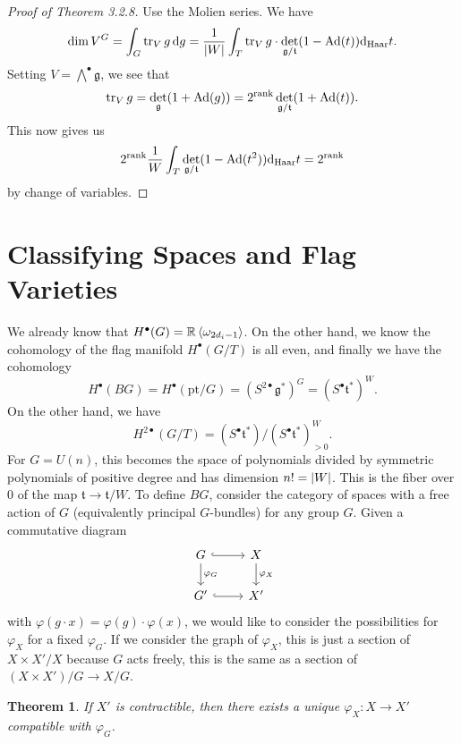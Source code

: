 \documentclass[leqno, openany]{memoir}
\newtheorem{thm}{Theorem}[section]
\theoremstyle{definition}
\theoremstyle{remark}
\theoremstyle{plain}
\theoremstyle{definition}
\theoremstyle{remark}
\newcommand{\R}{\mathbb{R}}
\newcommand{\mf}[1]{\mathfrak{#1}}
\newcommand{\mr}[1]{\mathrm{#1}}
\DeclareMathOperator{\Ad}{Ad}
\begin{document}
\begin{proof}[Proof of Theorem 3.2.8]
    Use the Molien series. We have
    \[ \dim V^G = \int_G \tr_V g \dd{g} = \frac{1}{\abs{W}} \int_T \tr_V g \cdot \det_{\mf{g}/\mf{t}} (1 - \Ad(t)) \dd_{\mr{Haar}} t. \]
    Setting $V = \bigwedge^{\bullet} \mf{g}$, we see that 
    \[ \tr_V g = \det_{\mf{g}} (1 + \Ad(g)) = 2^{\rank} \det_{\mf{g}/\mf{t}} (1 + \Ad(t)). \]
    This now gives us
    \[ 2^{\rank} \frac{1}{W} \int_T \det_{\mf{g}/\mf{t}} (1 - \Ad(t^2)) \dd_{\mr{Haar}} t = 2^{\rank} \]
    by change of variables.
\end{proof}

\section{Classifying Spaces and Flag Varieties}%
\label{sec:classifying_spaces_and_flag_varieties}

We already know that $H^{\bullet}(G) = \R \ev{\omega_{2d_i - 1}}$. On the other hand, we know the cohomology of the flag manifold $H^{\bullet}(G/T)$ is all even, and finally we have the cohomology 
\[ H^{\bullet}(BG) = H^{\bullet}(\mr{pt} /G) = {(S^{2\bullet} \mf{g}^*)}^G = {(S^{\bullet} \mf{t}^*)}^W. \]
On the other hand, we have
\[ H^{2\bullet}(G/T) = {(S^{\bullet} \mf{t}^*)} / {(S^{\bullet} \mf{t}^*)}^W_{>0}. \]
For $G = U(n)$, this becomes the space of polynomials divided by symmetric polynomials of positive degree and has dimension $n! = \abs{W}$. This is the fiber over $0$ of the map $\mf{t} \to \mf{t} / W$. To define $BG$, consider the category of spaces with a free action of $G$ (equivalently principal $G$-bundles) for any group $G$. Given a commutative diagram
\begin{equation*}
\begin{tikzcd}
    G \ar[hookrightarrow]{r} \ar{d}{\varphi_G} & X \ar{d}{\varphi_X} \\
    G' \ar[hookrightarrow]{r} & X'
\end{tikzcd}
\end{equation*}
with $\varphi(g \cdot x) = \varphi(g) \cdot \varphi(x)$, we would like to consider the possibilities for $\varphi_X$ for a fixed $\varphi_G$. If we consider the graph of $\varphi_X$, this is just a section of $X \times X' / X$ because $G$ acts freely, this is the same as a section of $(X \times X')/G \to X/G$.

\begin{thm}
    If $X'$ is contractible, then there exists a unique $\varphi_X \colon X \to X'$ compatible with $\varphi_G$.
\end{thm}
\end{document}
